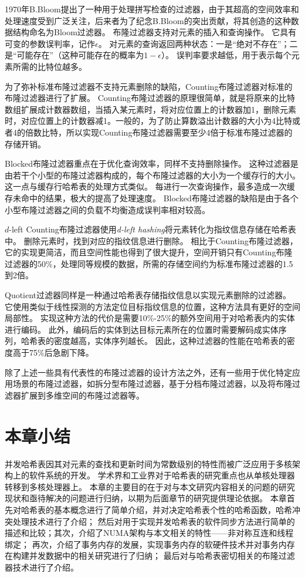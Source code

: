 1970年B.Bloom\cite{bloom1970space}提出了一种用于处理拼写检查的过滤器，由于其超高的空间效率和处理速度受到广泛关注，后来者为了纪念B.Bloom的突出贡献，将其创造的这种数据结构命名为Bloom过滤器。
布隆过滤器支持对元素的插入和查询操作。
它具有可变的参数误判率，记作$\epsilon$。
对元素的查询返回两种状态：一是“绝对不存在”；二是“可能存在”（这种可能存在的概率为$1-\epsilon$）。
误判率要求越低，用于表示每个元素所需的比特位越多。

为了弥补标准布隆过滤器不支持元素删除的缺陷，Counting布隆过滤器\cite{fan1998summary}对标准的布隆过滤器进行了扩展。
Counting布隆过滤器的原理很简单，就是将原来的比特数组扩展成计数器数组，当插入某元素时，将对应位置上的计数器加1，删除元素时，对应位置上的计数器减1。一般的，为了防止算数溢出计数器的大小为4比特或者4的倍数比特，所以实现Counting布隆过滤器需要至少4倍于标准布隆过滤器的存储开销。

Blocked布隆过滤器\cite{putze2007cache}重点在于优化查询效率，同样不支持删除操作。
这种过滤器是由若干个小型的布隆过滤器构成的，每个布隆过滤器的大小为一个缓存行的大小。
这一点与缓存行哈希表\cite{clht}的处理方式类似。
每进行一次查询操作，最多造成一次缓存未命中的结果，极大的提高了处理速度。
Blocked布隆过滤器的缺陷是由于各个小型布隆过滤器之间的负载不均衡造成误判率相对较高。

$d$-left Counting布隆过滤器\cite{bonomi2006improved}使用\textit{d-left hashing}\cite{mitzenmacher1999asymptotics}将元素转化为指纹信息存储在哈希表中。
删除元素时，找到对应的指纹信息进行删除。
相比于Counting布隆过滤器，它的实现更简洁，而且空间性能也得到了很大提升，空间开销只有Counting布隆过滤器的50\%，处理同等规模的数据，所需的存储空间约为标准布隆过滤器的1.5到2倍。

Quotient过滤器\cite{bender2012don}同样是一种通过哈希表存储指纹信息以实现元素删除的过滤器。
它使用类似于线性探测的方法定位目标指纹信息的位置，这种方法具有更好的空间局部性。
实现这种方法的代价是需要10\%-25\%的额外空间用于对哈希表内的实体进行编码。
此外，编码后的实体到达目标元素所在的位置时需要解码成实体序列，哈希表的密度越高，实体序列越长。
因此，这种过滤器的性能在哈希表的密度高于75\%后急剧下降。

除了上述一些具有代表性的布隆过滤器的设计方法之外，还有一些用于优化特定应用场景的布隆过滤器，如拆分型布隆过滤器\cite{xiaomingzhong2004}，基于分档布隆过滤器\cite{xiekun2007}，以及将布隆过滤器扩展到多维空间的布隆过滤器\cite{xiekun2008}等。


\section{本章小结}
并发哈希表因其对元素的查找和更新时间为常数级别的特性而被广泛应用于多核架构上的软件系统的开发。
学术界和工业界对于哈希表的研究重点也从单核处理器转移到多核处理器上。
本章的主要目的在于对与本文研究内容相关的问题的研究现状和亟待解决的问题进行归纳，以期为后面章节的研究提供理论依据。
本章首先对哈希表的基本概念进行了简单介绍，并对决定哈希表个性的哈希函数，哈希冲突处理技术进行了介绍；
然后对用于实现并发哈希表的软件同步方法进行简单的描述和比较；其次，介绍了NUMA架构与本文相关的特性——非对称互连和线程绑定；
再次，介绍了事务内存的发展，实现事务内存的软硬件技术并对事务内存在构建并发数据中的相关研究进行了归纳；
最后对与哈希表密切相关的布隆过滤器技术进行了介绍。


